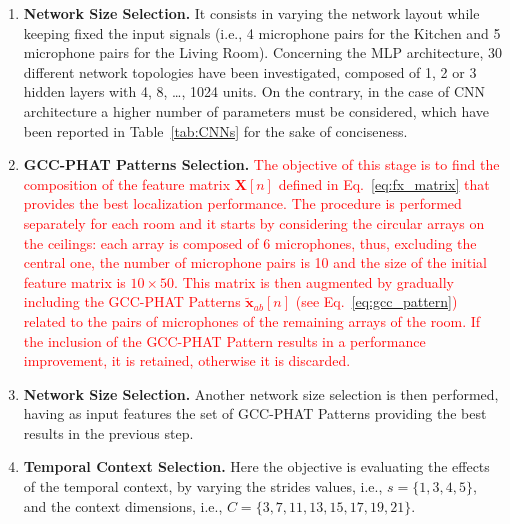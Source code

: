 \documentclass[review]{elsarticle}
\newcommand{\tableref}[1]{Table~\ref{#1}}
\let\originaleqref=\eqref
\renewcommand{\eqref}{Eq.~\originaleqref}
\begin{document}
\begin{enumerate}
	\item{\textbf{Network Size Selection.}}  It consists in varying the network layout while keeping fixed the input signals (i.e., 4 microphone pairs for the Kitchen and 5 microphone pairs for the Living Room). 
	Concerning the MLP architecture, 30 different network topologies have been investigated, composed of 1, 2 or 3 hidden layers with 4, 8, \dots, 1024 units. 
	On the contrary, in the case of CNN architecture a higher number of parameters must be considered, which have been reported in \tableref{tab:CNNs} for the sake of conciseness. 
	\item{\textbf{GCC-PHAT Patterns Selection.}} \textcolor{red}{The objective of this stage is to find the composition of the feature matrix $\mathbf{X}[n]$ defined in \eqref{eq:fx_matrix} that provides the best localization performance. The procedure is performed separately for each room and it starts by considering the circular arrays on the ceilings: each array is composed of 6 microphones, thus, excluding the central one, the number of microphone pairs is 10 and the size of the initial feature matrix is $10 \times 50$. This matrix is then augmented by gradually including the GCC-PHAT Patterns $\mathbf{\tilde{x}}_{ab}[n]$ (see \eqref{eq:gcc_pattern}) related to the pairs of microphones of the remaining arrays of the room. If the inclusion of the GCC-PHAT Pattern results in a performance improvement, it is retained, otherwise it is discarded.}
	
	\item{\textbf{Network Size Selection.}} Another network size selection is then performed, having as input features the set of GCC-PHAT Patterns providing the best results in the previous step. 
	\item{\textbf{Temporal Context Selection.}} Here the objective is evaluating the effects of the temporal context, by varying the strides values, i.e., $s=\{1,3,4,5\}$, and the context dimensions, i.e., $C=\{3,7,11,13,15,17,19,21\}$.
\end{enumerate}
\end{document}
